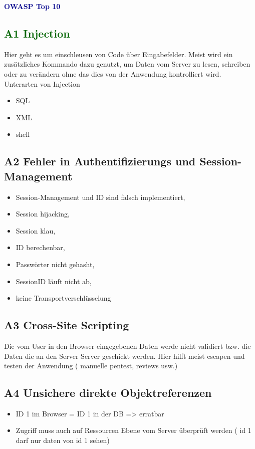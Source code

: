 \textbf{\textcolor{darkblue}{ OWASP Top 10}}~

\textcolor{darkgreen}{\subsection*{A1 Injection}}

Hier geht es um einschleusen von Code über Eingabefelder. Meist wird ein zusätzliches Kommando
dazu genutzt, um Daten vom Server zu lesen, schreiben oder zu verändern ohne das dies von
der Anwendung kontrolliert wird.
Unterarten von Injection
	\begin{itemize}
	\item SQL
	\item XML
	\item shell
	\end{itemize}

\subsection*{A2 Fehler in Authentifizierungs und Session-Management}

	\begin{itemize}
	\item Session-Management und ID sind falsch implementiert,
	\item Session hijacking,
	\item Session klau, 
	\item ID berechenbar,
	\item Passwörter nicht gehasht,
	\item SessionID läuft nicht ab,
	\item keine Transportverschlüsselung
	\end{itemize}

\subsection*{A3 Cross-Site Scripting}

Die vom User in den Browser eingegebenen Daten werde nicht validiert bzw. die Daten die an den Server
Server geschickt werden. Hier hilft meist escapen und testen der Anwendung ( manuelle pentest, reviews usw.)

\subsection*{A4 Unsichere direkte Objektreferenzen}

	\begin{itemize}
	\item ID 1 im Browser = ID 1 in der DB => erratbar
	\item Zugriff muss auch auf Ressourcen Ebene vom Server überprüft werden ( id 1 darf nur daten von id 1 sehen)
	\end{itemize}



